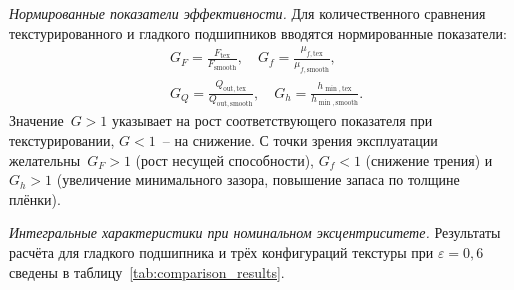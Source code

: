 \textit{Нормированные показатели эффективности.}
Для количественного сравнения текстурированного
и гладкого подшипников вводятся нормированные показатели:
\begin{equation}
\begin{split}
  &G_F = \frac{F_{\mathrm{tex}}}{F_{\mathrm{smooth}}}, \quad
  G_f = \frac{\mu_{f,\mathrm{tex}}}{\mu_{f,\mathrm{smooth}}}, \\
  &G_Q = \frac{Q_{\mathrm{out,tex}}}{Q_{\mathrm{out,smooth}}}, \quad
  G_h = \frac{h_{\min,\mathrm{tex}}}{h_{\min,\mathrm{smooth}}}.
\end{split}
  \label{eq:gain_factors}
\end{equation}
Значение~$G > 1$ указывает на рост соответствующего показателя
при текстурировании, $G < 1$~-- на снижение. С точки зрения
эксплуатации желательны~$G_F > 1$ (рост несущей способности),
$G_f < 1$ (снижение трения) и $G_h > 1$ (увеличение минимального
зазора, повышение запаса по толщине плёнки).

\textit{Интегральные характеристики при номинальном эксцентриситете.}
Результаты расчёта для гладкого подшипника и трёх конфигураций
текстуры при $\varepsilon = 0{,}6$ сведены в
таблицу~\ref{tab:comparison_results}.

\begin{table}[!ht]
\centering
\caption{Интегральные характеристики подшипников при $\varepsilon = 0{,}6$}
\label{tab:comparison_results}
\end{table}

\FloatBarrier

